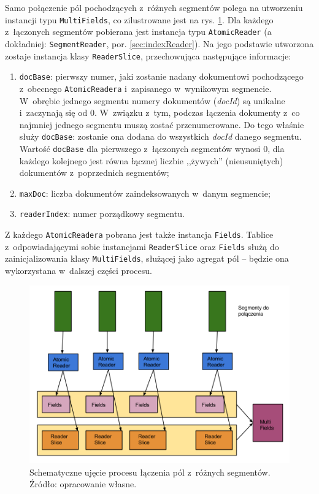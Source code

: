 Samo połączenie pól pochodzących z~różnych segmentów polega na utworzeniu instancji typu \texttt{MultiFields}, co zilustrowane jest na rys. \ref{fig:fieldMerge}. Dla każdego z~łączonych segmentów pobierana jest instancja typu \texttt{AtomicReader} (a dokładniej: \texttt{SegmentReader}, por. \ref{sec:indexReader}). Na jego podstawie utworzona zostaje instancja klasy \texttt{ReaderSlice}, przechowująca następujące informacje:
\begin{enumerate}
 \item \texttt{docBase}: pierwszy numer, jaki zostanie nadany dokumentowi pochodzącego z~obecnego \texttt{AtomicReadera} i~zapisanego w~wynikowym segmencie. W~obrębie jednego segmentu numery dokumentów (\emph{docId}) są unikalne i~zaczynają się od 0. W~związku z~tym, podczas łączenia dokumenty z~co najmniej jednego segmentu muszą zostać przenumerowane. Do tego właśnie służy \texttt{docBase}: zostanie ona dodana do wszystkich \emph{docId} danego segmentu. Wartość \texttt{docBase} dla pierwszego z~łączonych segmentów wynosi 0, dla każdego kolejnego jest równa łącznej liczbie ,,żywych'' (nieusuniętych) dokumentów z~poprzednich segmentów;
 \item \texttt{maxDoc}: liczba dokumentów zaindeksowanych w~danym segmencie;
 \item \texttt{readerIndex}: numer porządkowy segmentu.
\end{enumerate}

Z każdego \texttt{AtomicReadera} pobrana jest także instancja \texttt{Fields}. Tablice z~odpowiadającymi sobie instancjami \texttt{ReaderSlice} oraz \texttt{Fields} służą do zainicjalizowania klasy \texttt{MultiFields}, służącej jako agregat pól -- będzie ona wykorzystana w~dalszej części procesu.

\begin{figure}[here]
 \includegraphics[scale=0.4]{pictures/LaczeniePol.png}
 \caption{Schematyczne ujęcie procesu łączenia pól z~różnych segmentów. Źródło: opracowanie własne. \label{fig:fieldMerge}}
\end{figure}

